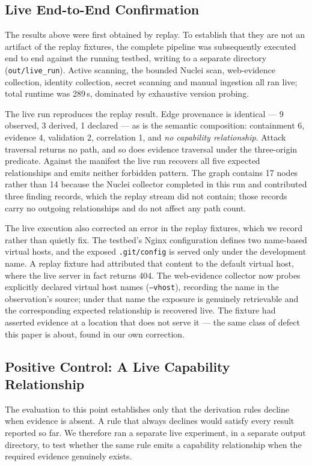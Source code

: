 \documentclass[11pt,a4paper]{article}
\begin{document}
\subsection{Live End-to-End Confirmation}\label{sec:live}
The results above were first obtained by replay. To establish that they are not
an artifact of the replay fixtures, the complete pipeline was subsequently
executed end to end against the running testbed, writing to a separate directory
(\texttt{out/live\_run}). Active scanning, the bounded Nuclei scan, web-evidence
collection, identity collection, secret scanning and manual ingestion all ran
live; total runtime was 289\,s, dominated by exhaustive version probing.

The live run reproduces the replay result. Edge provenance is identical --- 9
observed, 3 derived, 1 declared --- as is the semantic composition: containment
6, evidence 4, validation 2, correlation 1, and \emph{no capability
relationship}. Attack traversal returns no path, and so does evidence traversal
under the three-origin predicate. Against the manifest the live run recovers all
five expected relationships and emits neither forbidden pattern. The graph
contains 17 nodes rather than 14 because the Nuclei collector completed in this
run and contributed three finding records, which the replay stream did not
contain; those records carry no outgoing relationships and do not affect any
path count.

The live execution also corrected an error in the replay fixtures, which we
record rather than quietly fix. The testbed's Nginx configuration defines two
name-based virtual hosts, and the exposed \texttt{.git/config} is served only
under the development name. A replay fixture had attributed that content to the
default virtual host, where the live server in fact returns 404. The
web-evidence collector now probes explicitly declared virtual host names
(\texttt{--vhost}), recording the name in the observation's source; under that
name the exposure is genuinely retrievable and the corresponding expected
relationship is recovered live. The fixture had asserted evidence at a location
that does not serve it --- the same class of defect this paper is about, found in
our own correction.

\subsection{Positive Control: A Live Capability Relationship}\label{sec:positive}
The evaluation to this point establishes only that the derivation rules decline
when evidence is absent. A rule that always declines would satisfy every result
reported so far. We therefore ran a separate live experiment, in a separate
output directory, to test whether the same rule emits a capability relationship
when the required evidence genuinely exists.
\end{document}
